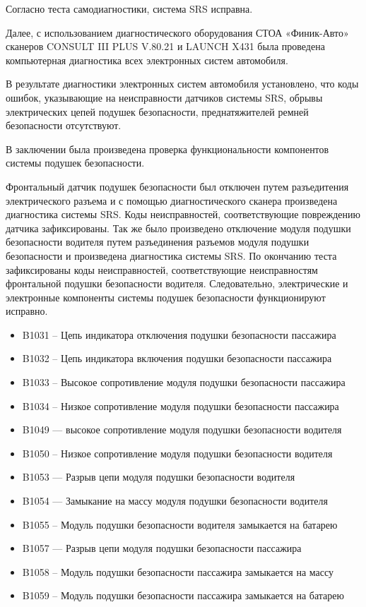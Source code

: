Согласно   теста самодиагностики,  система SRS исправна.

Далее, с использованием диагностического оборудования  СТОА «Финик-Авто»   сканеров CONSULT III PLUS V.80.21 и LAUNCH X431 была проведена компьютерная диагностика всех электронных систем автомобиля.

В результате диагностики электронных систем автомобиля установлено, что коды ошибок, указывающие на неисправности датчиков системы SRS, обрывы электрических цепей подушек безопасности, преднатяжителей ремней безопасности отсутствуют.


В заключении была произведена проверка функциональности компонентов системы подушек безопасности.

Фронтальный датчик подушек безопасности был отключен путем разъедитения электрического разъема и с помощью диагностического сканера произведена диагностика системы SRS. Коды неисправностей, соответствующие повреждению датчика зафиксированы.  Так же было произведено отключение модуля подушки безопасности водителя путем разъединения разъемов  модуля подушки безопасности и произведена диагностика системы SRS. По окончанию теста  зафиксированы коды неисправностей, соответствующие неисправностям фронтальной подушки безопасности водителя.  Следовательно, электрические и электронные компоненты системы подушек безопасности функционируют исправно.


\begin{itemize}
	\item B1031 – Цепь индикатора отключения подушки безопасности пассажира
	\item B1032 – Цепь индикатора включения подушки безопасности пассажира
	\item B1033 – Высокое сопротивление модуля подушки безопасности пассажира
	\item B1034 – Низкое сопротивление модуля подушки безопасности пассажира
	\item B1049 — высокое сопротивление модуля подушки безопасности водителя
	\item B1050 – Низкое сопротивление модуля подушки безопасности водителя
	\item B1053 — Разрыв цепи модуля подушки безопасности водителя
	\item B1054 — Замыкание на массу модуля подушки безопасности водителя
	\item B1055 – Модуль подушки безопасности водителя замыкается на батарею
	\item B1057 — Разрыв цепи модуля подушки безопасности пассажира
	\item B1058 – Модуль подушки безопасности пассажира замыкается на массу
	\item B1059 – Модуль подушки безопасности пассажира замыкается на батарею
\end{itemize}

